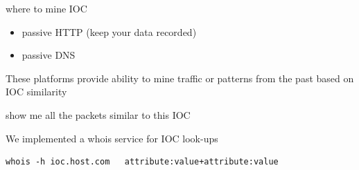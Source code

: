 \documentclass[presentation,smaller]{beamer}
\begin{document}
\begin{frame}[fragile,label=sec-7-4]{where to mine IOC}
 \begin{itemize}
\item passive HTTP (keep your data recorded)
\item passive DNS
\end{itemize}

These platforms provide
ability to mine traffic or patterns from the past
based on IOC similarity

\alert{show me all the packets similar to this IOC}

We implemented a whois service for IOC look-ups
\lstset{language=sh,numbers=none}
\begin{lstlisting}
whois -h ioc.host.com   attribute:value+attribute:value
\end{lstlisting}
\end{frame}
\end{document}
